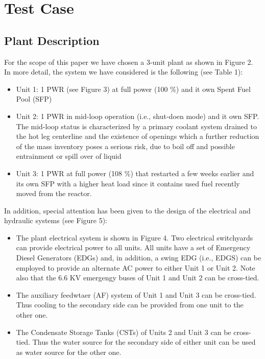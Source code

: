 \section{Test Case}
\label{sec:testCase}

\subsection{Plant Description}
For the scope of this paper we have chosen a 3-unit plant as shown in Figure 2. 
In more detail, the system we have considered is the following (see Table 1):
\begin{itemize}
  \item Unit 1: 1 PWR (see Figure 3) at full power (100 \%) and it own Spent Fuel Pool (SFP)
  \item Unit 2: 1 PWR in mid-loop operation (i.e., shut-doen mode) and it own SFP. 
                The mid-loop status is characterized by a primary coolant system drained to the 
                hot leg centerline and the existence of openings which a further reduction of 
                the mass inventory poses a serious risk, due to boil off and possible entrainment 
                or spill over of liquid
  \item Unit 3: 1 PWR at full power (108 \%) that restarted a few weeks earlier and its own SFP 
                with a higher heat load since it contains used fuel recently moved from the reactor.
\end{itemize}

In addition, special attention has been given to the design of the electrical and hydraulic systems (see Figure 5):
\begin{itemize}
  \item The plant electrical system is shown in Figure 4. Two electrical switchyards can provide 
        electrical power to all units. All units have a set of Emergency Diesel Generators (EDGs) 
        and, in addition, a swing EDG (i.e., EDGS) can be employed to provide an alternate AC power to either
        Unit 1 or Unit 2. Note also that the 6.6 KV emergengy buses of Unit 1 and Unit 2 can be cross-tied.
  \item The auxiliary feedwtaer (AF) system of Unit 1 and Unit 3 can be cross-tied. Thus cooling to the 
        secondary side can be provided from one unit to the other one.
  \item The Condensate Storage Tanks (CSTs) of Units 2 and Unit 3 can be cross-tied. Thus the water source 
        for the secondary side of either unit can be used as water source for the other one.
\end{itemize}

